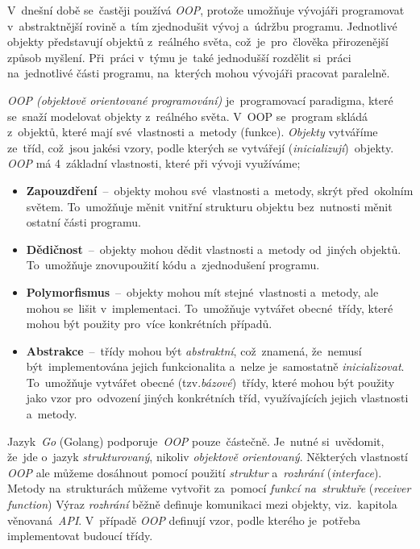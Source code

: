 \documentclass[10pt,a4paper]{article}
\begin{document}
            V~dnešní době se~častěji používá \emph{OOP}, protože umožňuje vývojáři programovat v~abstraktnější rovině a~tím zjednodušit vývoj a~údržbu programu. Jednotlivé objekty představují  objektů z~reálného světa, což~je~pro~člověka přirozenější způsob myšlení. Při~práci v~týmu je~také jednodušší rozdělit si~práci na~jednotlivé části programu, na~kterých mohou vývojáři pracovat paralelně.
            
            \emph{OOP (objektově orientované programování)} je~programovací paradigma, které se~snaží modelovat objekty z~reálného světa. V~OOP se~program skládá z~objektů, které mají své~vlastnosti a~metody (funkce). \emph{Objekty} vytváříme ze~tříd, což~jsou jakési vzory, podle kterých se vytvářejí (\emph{inicializují})~objekty. \emph{OOP} má 4~základní vlastnosti, které při vývoji využíváme; \cite{Keogh:OOP}
            \begin{itemize}
                \item \textbf{Zapouzdření}~--~objekty mohou své~vlastnosti a~metody, skrýt před~okolním světem. To~umožňuje měnit vnitřní strukturu objektu bez~nutnosti měnit ostatní části programu.
                \item \textbf{Dědičnost}~--~objekty mohou dědit vlastnosti a~metody od~jiných objektů. To~umožňuje znovupoužití kódu a~zjednodušení programu.
                \item \textbf{Polymorfismus}~--~objekty mohou mít stejné~vlastnosti a~metody, ale mohou se~lišit v~implementaci. To~umožňuje vytvářet obecné~třídy, které mohou být použity pro~více konkrétních případů.
                \item \textbf{Abstrakce}~--~třídy mohou být \emph{abstraktní}, což~znamená, že~nemusí být~implementována jejich funkcionalita a~nelze je~samostatně \emph{inicializovat}. To~umožňuje vytvářet obecné (tzv.\emph{bázové})~třídy, které mohou být použity jako vzor pro~odvození jiných konkrétních tříd, využívajících jejich vlastnosti a~metody.
            \end{itemize}

            Jazyk~\emph{Go} (Golang) podporuje~\emph{OOP} pouze~částečně. Je~nutné si~uvědomit, že~jde o~jazyk \emph{strukturovaný}, nikoliv \emph{objektově orientovaný}. Některých vlastností \emph{OOP} ale můžeme dosáhnout pomocí použití \emph{struktur} a~\emph{rozhrání} (\emph{interface}). Metody na~strukturách můžeme vytvořit za~pomocí \emph{funkcí na~struktuře} (\emph{receiver function})
            Výraz \emph{rozhrání} běžně definuje komunikaci mezi objekty, viz.~kapitola věnovaná~\emph{API}. V~případě \emph{OOP} definují vzor, podle kterého je~potřeba implementovat budoucí třídy. \cite{go:OOP}
            
\end{document}
